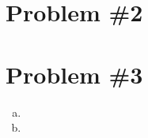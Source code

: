 \documentclass[11pt]{article}
\numberwithin{equation}{section}
\begin{document}
\section{Problem \#2}

\section{Problem \#3}
\begin{enumerate}[(a)]
\item
\item
\end{enumerate}
\end{document}
